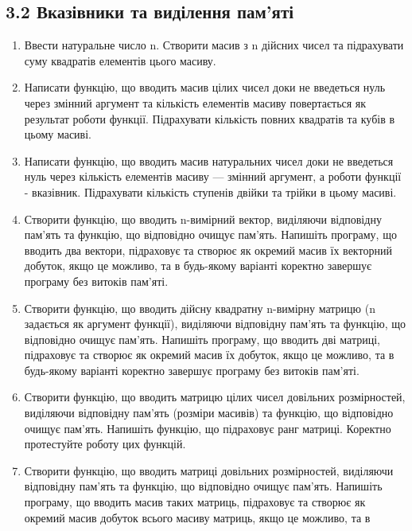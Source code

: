 \documentclass[]{article}
\begin{document}
\subsection{3.2 Вказівники та виділення
пам'яті}\label{ux432ux43aux430ux437ux456ux432ux43dux438ux43aux438-ux442ux430-ux432ux438ux434ux456ux43bux435ux43dux43dux44f-ux43fux430ux43cux44fux442ux456}

\begin{enumerate}
\def\labelenumi{\arabic{enumi})}
\item
  Ввести натуральне число n. Створити масив з n дійсних чисел та
  підрахувати суму квадратів елементів цього масиву.
\item
  Написати функцію, що вводить масив цілих чисел доки не введеться нуль
  через змінний аргумент та кількість елементів масиву повертається як
  результат роботи функції. Підрахувати кількість повних квадратів та
  кубів в цьому масиві.
\item
  Написати функцію, що вводить масив натуральних чисел доки не введеться
  нуль через кількість елементів масиву --- змінний аргумент, а роботи
  функції - вказівник. Підрахувати кількість ступенів двійки та трійки в
  цьому масиві.
\item
  Створити функцію, що вводить n-вимірний вектор, виділяючи відповідну
  пам'ять та функцію, що відповідно очищує пам'ять. Напишіть програму,
  що вводить два вектори, підраховує та створює як окремий масив їх
  векторний добуток, якщо це можливо, та в будь-якому варіанті коректно
  завершує програму без витоків пам'яті.
\item
  Створити функцію, що вводить дійсну квадратну n-вимірну матрицю (n
  задається як аргумент функції), виділяючи відповідну пам'ять та
  функцію, що відповідно очищує пам'ять. Напишіть програму, що вводить
  дві матриці, підраховує та створює як окремий масив їх добуток, якщо
  це можливо, та в будь-якому варіанті коректно завершує програму без
  витоків пам'яті.
\item
  Створити функцію, що вводить матрицю цілих чисел довільних
  розмірностей, виділяючи відповідну пам'ять (розміри масивів) та
  функцію, що відповідно очищує пам'ять. Напишіть функцію, що підраховує
  ранг матриці. Коректно протестуйте роботу цих функцій.
\item
  Створити функцію, що вводить матриці довільних розмірностей, виділяючи
  відповідну пам'ять та функцію, що відповідно очищує пам'ять. Напишіть
  програму, що вводить масив таких матриць, підраховує та створює як
  окремий масив добуток всього масиву матриць, якщо це можливо, та в

\end{enumerate}
\end{document}
